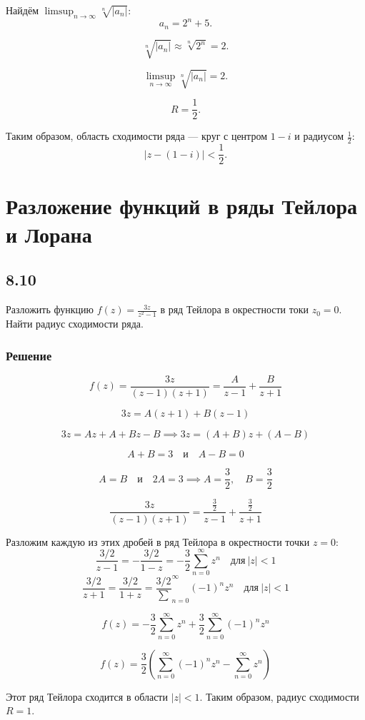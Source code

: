 \documentclass[12pt,a4paper]{article}
\begin{document}
Найдём \(\limsup_{n \to \infty} \sqrt[n]{|a_n|}\):
\[
a_n = 2^n + 5.
\]

\[
\sqrt[n]{|a_n|} \approx \sqrt[n]{2^n} = 2.
\]

\[
\limsup_{n \to \infty} \sqrt[n]{|a_n|} = 2.
\]

\[
R = \frac{1}{2}.
\]

Таким образом, область сходимости ряда — круг с центром  \( 1 - i \) и радиусом \(\frac{1}{2}\):
\[
|z - (1 - i)| < \frac{1}{2}.
\]
\section{Разложение функций в ряды Тейлора и Лорана}
\subsection*{8.10}
Разложить функцию $f(z)=\frac{3z}{z^2-1}$ в ряд Тейлора в окрестности токи $z_0=0$. Найти радиус сходимости ряда.
\subsubsection*{Решение}

\[
f(z) = \frac{3z}{(z - 1)(z + 1)} = \frac{A}{z - 1} + \frac{B}{z + 1}
\]

\[
3z = A(z + 1) + B(z - 1)
\]

\[
3z = Az + A + Bz - B \implies 3z = (A + B)z + (A - B)
\]

\[
A + B = 3 \quad \text{и} \quad A - B = 0
\]

\[
A = B \quad \text{и} \quad 2A = 3 \implies A = \frac{3}{2}, \quad B = \frac{3}{2}
\]

\[
\frac{3z}{(z - 1)(z + 1)} = \frac{\frac{3}{2}}{z - 1} + \frac{\frac{3}{2}}{z + 1}
\]

Разложим каждую из этих дробей в ряд Тейлора в окрестности точки \( z = 0 \):
\[
\frac{3/2}{z - 1} = -\frac{3/2}{1 - z} = -\frac{3}{2} \sum_{n=0}^{\infty} z^n \quad \text{для} \ |z| < 1
\]
\[
\frac{3/2}{z + 1} = \frac{3/2}{1 + z} = \frac{3/2} \sum_{n=0}^{\infty} (-1)^n z^n \quad \text{для} \ |z| < 1
\]

\[
f(z) = -\frac{3}{2} \sum_{n=0}^{\infty} z^n + \frac{3}{2} \sum_{n=0}^{\infty} (-1)^n z^n
\]

\[
f(z) = \frac{3}{2} \left( \sum_{n=0}^{\infty} (-1)^n z^n - \sum_{n=0}^{\infty} z^n \right)
\]

Этот ряд Тейлора сходится в области \( |z| < 1 \). Таким образом, радиус сходимости \( R = 1 \).
\end{document}
